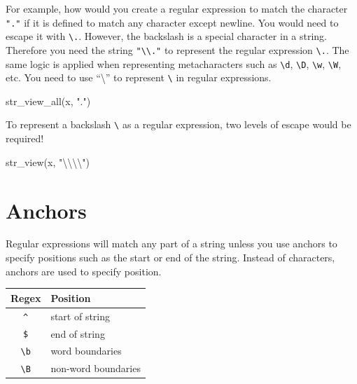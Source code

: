 \documentclass[
]{book}
\newenvironment{Shaded}{\begin{snugshade}}{\end{snugshade}}
\newcommand{\FunctionTok}[1]{\textcolor[rgb]{0.00,0.00,0.00}{#1}}
\newcommand{\NormalTok}[1]{#1}
\newcommand{\SpecialCharTok}[1]{\textcolor[rgb]{0.00,0.00,0.00}{#1}}
\newcommand{\StringTok}[1]{\textcolor[rgb]{0.31,0.60,0.02}{#1}}
\begin{document}
For example, how would you create a regular expression to match the character \texttt{"."} if it is defined to match any character except newline. You would need to escape it with \texttt{\textbackslash{}.}. However, the backslash is a special character in a string. Therefore you need the string \texttt{"\textbackslash{}\textbackslash{}."} to represent the regular expression \texttt{\textbackslash{}.}. The same logic is applied when representing metacharacters such as \texttt{\textbackslash{}d}, \texttt{\textbackslash{}D}, \texttt{\textbackslash{}w}, \texttt{\textbackslash{}W}, etc. You need to use ``\textbackslash{}'' to represent \texttt{\textbackslash{}} in regular expressions.

\begin{Shaded}
\begin{Highlighting}[]
\FunctionTok{str\_view\_all}\NormalTok{(x, }\StringTok{"."}\NormalTok{)}
\end{Highlighting}
\end{Shaded}

To represent a backslash \texttt{\textbackslash{}} as a regular expression, two levels of escape would be required!

\begin{Shaded}
\begin{Highlighting}[]
\FunctionTok{str\_view}\NormalTok{(x, }\StringTok{"}\SpecialCharTok{\textbackslash{}\textbackslash{}\textbackslash{}\textbackslash{}}\StringTok{"}\NormalTok{)}
\end{Highlighting}
\end{Shaded}

\hypertarget{anchors}{%
\section{Anchors}\label{anchors}}

Regular expressions will match any part of a string unless you use anchors to specify positions such as the start or end of the string. Instead of characters, anchors are used to specify position.

\begin{longtable}[]{@{}cl@{}}
\toprule
Regex & Position \\
\midrule
\endhead
\texttt{\^{}} & start of string \\
\texttt{\$} & end of string \\
\texttt{\textbackslash{}b} & word boundaries \\
\texttt{\textbackslash{}B} & non-word boundaries \\
\bottomrule
\end{longtable}
\end{document}
